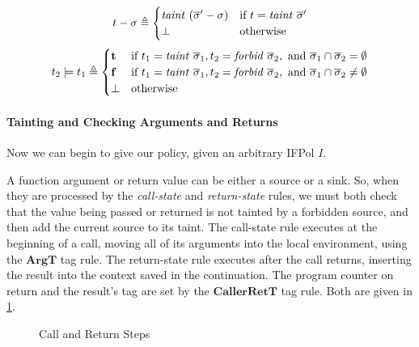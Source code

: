 \documentclass[acmsmall,review,anonymous]{acmart}\settopmatter{printfolios=true,printccs=false,printacmref=false}
\begin{document}
%
\[t - \sigma \triangleq
\begin{cases}
  \mathit{taint} ~ (\overline{\sigma}' - \sigma) &
  \textnormal{if } t = \mathit{taint} ~ \overline{\sigma}' \\
  \bot & \textnormal{otherwise} \\
\end{cases}\]
%
\[t_2 \models t_1 \triangleq
\begin{cases}
  \mathbf{t} & \textnormal{if } t_1 = \mathit{taint} ~ \overline{\sigma}_1,
  t_2 = \mathit{forbid} ~ \overline{\sigma}_2, \textnormal{ and }
  \overline{\sigma}_1 \cap \overline{\sigma}_2 = \emptyset \\
  \mathbf{f} & \textnormal{if } t_1 = \mathit{taint} ~ \overline{\sigma}_1,
  t_2 = \mathit{forbid} ~ \overline{\sigma}_2, \textnormal{ and }
  \overline{\sigma}_1 \cap \overline{\sigma}_2 \not = \emptyset \\
  \bot & \textnormal{otherwise} \\
\end{cases}\]

\paragraph{Tainting and Checking Arguments and Returns}

Now we can begin to give our policy, given an arbitrary IFPol \(I\).

A function argument or return value can be either a source or a sink.
So, when they are processed by the {\em call-state} and {\em return-state} rules,
we must both check that the value being passed or returned is not tainted by a forbidden
source, and then add the current source to its taint.
The call-state rule executes at the beginning of a call, moving all of its arguments into
the local environment, using the \(\mathbf{ArgT}\) tag rule.
The return-state rule executes after the call returns, inserting the result into the
context saved in the continuation. The program counter on return and the result's tag are
set by the \(\mathbf{CallerRetT}\) tag rule. Both are given in \cref{fig:callretsteps}.

\begin{figure}
  \callstep
  \returnstep
  \caption{Call and Return Steps}
  \label{fig:callretsteps}
\end{figure}
  
\end{document}
